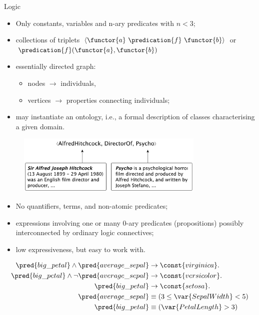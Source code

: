 \documentclass[presentation]{beamer}\mode<presentation>{\usetheme{AMSBolognaFC}}
\begin{document}
\begin{frame}[allowframebreaks]{Logic}
    \framebreak
    
    \begin{itemize}
        \item Only constants, variables and n-ary predicates with $n < 3$;
        \item collections of triplets $\langle \functor{a}\ \predication{f}\ \functor{b} \rangle$ or $\predication{f}(\functor{a}, \functor{b})$
        \item essentially directed graph:
        \begin{itemize}
            \item nodes $\rightarrow$ individuals,
            \item vertices $\rightarrow$ properties connecting individuals;
        \end{itemize}
        \item may instantiate an ontology, i.e., a formal description of classes characterising a given domain.
    \end{itemize}
    
    \framebreak
    
    \begin{figure}
        \centering
        \includegraphics[width=0.8\textwidth]{figures/kg-example}
    \end{figure}    
    
    \framebreak
    
    \begin{itemize}
        \item No quantifiers, terms, and non-atomic predicates;
        \item expressions involving one or many 0-ary predicates (propositions) possibly interconnected by ordinary logic connectives;
        \item low expressiveness, but easy to work with.
    \end{itemize}
    \centering
    \begin{equation*}
        \begin{aligned}
            \pred{big\_petal}\wedge\pred{average\_sepal}&\rightarrow\const{virginica}.\\
            \pred{big\_petal}\wedge\neg\pred{average\_sepal}&\rightarrow\const{versicolor}.\\
            \pred{big\_petal}&\rightarrow\const{setosa}.\\
            \pred{average\_sepal}&\equiv(3\le\var{SepalWidth}<5)\\
            \pred{big\_petal}&\equiv(\var{PetalLength}>3)\\
        \end{aligned}    
    \end{equation*}
    

\end{frame}
\end{document}

